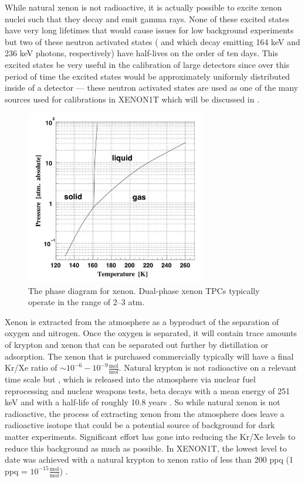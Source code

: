 While natural xenon is not radioactive, it is actually possible to excite xenon nuclei such that they decay and emit gamma rays.  None of these excited states have very long lifetimes that would cause issues for low background experiments but two of these neutron activated states ( and  which decay emitting 164 keV and 236 keV photons, respectively) have half-lives on the order of ten days.  This excited states be very useful in the calibration of large detectors since over this period of time the excited states would be approximately uniformly distributed inside of a detector \cite{ni2007preparation} --- these neutron activated states are used as one of the many sources used for calibrations in XENON1T which will be discussed in .

\begin{figure}[t]
	\centering
	\includegraphics[width=0.7\textwidth]{xe_pt_diagram}
	\caption{The phase diagram for xenon.  Dual-phase xenon TPCs typically operate in the range of 2--3 atm.}
	\label{fig:xe_phase_diagram}
\end{figure}

Xenon is extracted from the atmosphere as a byproduct of the separation of oxygen and nitrogen.  Once the oxygen is separated, it will contain trace amounts of krypton and xenon that can be separated out further by distillation or adsorption.  The xenon that is purchased commercially typically will have a final Kr/Xe ratio of $\sim 10^{-6} - 10^{-9} \frac{\textrm{mol}}{\textrm{mol}}$.  Natural krypton is not radioactive on a relevant time scale but , which is released into the atmosphere via nuclear fuel reprocessing and nuclear weapons tests, beta decays with a mean energy of 251 keV and with a half-life of roughly 10.8 years \cite{abe2009distillation}.  So while natural xenon is not radioactive, the process of extracting xenon from the atmosphere does leave a radioactive isotope that could be a potential source of background for dark matter experiments.  Significant effort has gone into reducing the Kr/Xe levels to reduce this background as much as possible.  In XENON1T, the lowest level to date was achieved with a natural krypton to xenon ratio of less than 200 ppq (1 ppq = $10^{-15} \frac{\textrm{mol}}{\textrm{mol}}$) \cite{aprile2017removing}.



